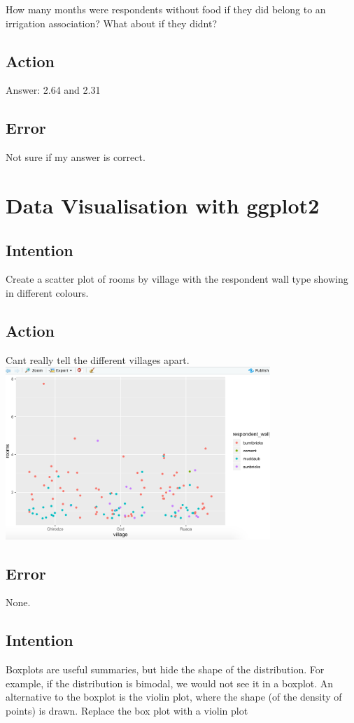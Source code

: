\documentclass{article}
\begin{document}
How many months were respondents without food if they did belong to an irrigation association? What about if they didnt?

\subsection{Action}
Answer: 2.64 and 2.31

\subsection{Error}
Not sure if my answer is correct.

\section{Data Visualisation with ggplot2}

\subsection{Intention}
Create a scatter plot of rooms by village with the respondent wall type showing in different colours.

\subsection{Action}
Cant really tell the different villages apart.\\
\includegraphics[width=10cm]{plot.png}

\subsection{Error}
None.

\subsection{Intention}
Boxplots are useful summaries, but hide the shape of the distribution. For example, if the distribution is bimodal, we would not see it in a boxplot. An alternative to the boxplot is the violin plot, where the shape (of the density of points) is drawn. Replace the box plot with a violin plot
\end{document}
